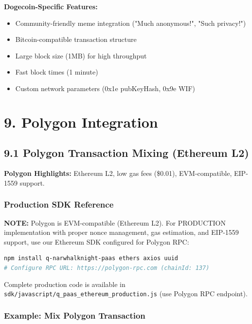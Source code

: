 \documentclass[11pt,a4paper]{article}
\begin{document}
\textbf{Dogecoin-Specific Features:}
\begin{itemize}
    \item Community-friendly meme integration ("Much anonymous!", "Such privacy!")
    \item Bitcoin-compatible transaction structure
    \item Large block size (1MB) for high throughput
    \item Fast block times (1 minute)
    \item Custom network parameters (0x1e pubKeyHash, 0x9e WIF)
\end{itemize}

\section{9. Polygon Integration}

\subsection{9.1 Polygon Transaction Mixing (Ethereum L2)}

\textbf{Polygon Highlights:} Ethereum L2, low gas fees (\$0.01), EVM-compatible, EIP-1559 support.

\subsubsection{Production SDK Reference}

\textbf{NOTE:} Polygon is EVM-compatible (Ethereum L2). For PRODUCTION implementation with proper nonce management, gas estimation, and EIP-1559 support, use our Ethereum SDK configured for Polygon RPC:

\begin{lstlisting}[language=bash]
npm install q-narwhalknight-paas ethers axios uuid
# Configure RPC URL: https://polygon-rpc.com (chainId: 137)
\end{lstlisting}

Complete production code is available in \texttt{sdk/javascript/q\_paas\_ethereum\_production.js} (use Polygon RPC endpoint).

\subsubsection{Example: Mix Polygon Transaction}
\end{document}

